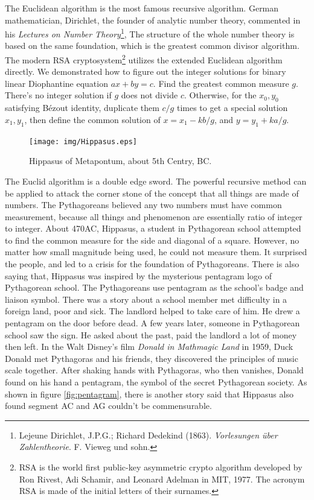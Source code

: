 \documentclass{article}
\begin{document}
The Euclidean algorithm is the most famous recursive algorithm. German mathematician, Dirichlet, the founder of analytic number theory, commented in his {\em Lectures on Number Theory}\footnote{Lejeune Dirichlet, J.P.G.; Richard Dedekind (1863). {\em Vorlesungen über Zahlentheorie}. F. Vieweg und sohn.}, The structure of the whole number theory is based on the same foundation, which is the greatest common divisor algorithm. The modern RSA cryptosystem\footnote{RSA is the world first public-key asymmetric crypto algorithm developed by Ron Rivest, Adi Schamir, and Leonard Adelman in MIT, 1977. The acronym RSA is made of the initial letters of their surnames.} utilizes the extended Euclidean algorithm directly. We demonstrated how to figure out the integer solutions for binary linear Diophantine equation $ax + by = c$. Find the greatest common measure $g$. There's no integer solution if $g$ does not divide $c$. Otherwise, for the $x_0, y_0$ satisfying Bézout identity, duplicate them $c/g$ times to get a special solution $x_1, y_1$, then define the common solution of $x = x_1 - k b / g$, and $y = y_1 + k a / g$.

\begin{figure}
 \centering
 \texttt{[image: img/Hippasus.eps]}
 \captionsetup{labelformat=empty}
 \caption{Hippasus of Metapontum, about 5th Centry, BC.}
 \label{fig:Hippasus}
\end{figure}

The Euclid algorithm is a double edge sword. The powerful recursive method can be applied to attack the corner stone of the concept that all things are made of numbers. The Pythagoreans believed any two numbers must have common measurement, because all things and phenomenon are essentially ratio of integer to integer. About 470AC, Hippasus, a student in Pythagorean school attempted to find the common measure for the side and diagonal of a square. However, no matter how small magnitude being used, he could not measure them. It surprised the people, and led to a crisis for the foundation of Pythagoreans. There is also saying that, Hippasus was inspired by the mysterious pentagram logo of Pythagorean school. The Pythagoreans use pentagram as the school's badge and liaison symbol. There was a story about a school member met difficulty in a foreign land, poor and sick. The landlord helped to take care of him. He drew a pentagram on the door before dead. A few years later, someone in Pythagorean school saw the sign. He asked about the past, paid the landlord a lot of money then left\cite{HanXueTao16}. In the Walt Disney's film {\em Donald in Mathmagic Land} in 1959, Duck Donald met Pythagoras and his friends, they discovered the principles of music scale together. After shaking hands with Pythagoras, who then vanishes, Donald found on his hand a pentagram, the symbol of the secret Pythagorean society. As shown in figure \ref{fig:pentagram}, there is another story said that Hippasus also found segment AC and AG couldn't be commensurable.
\end{document}
